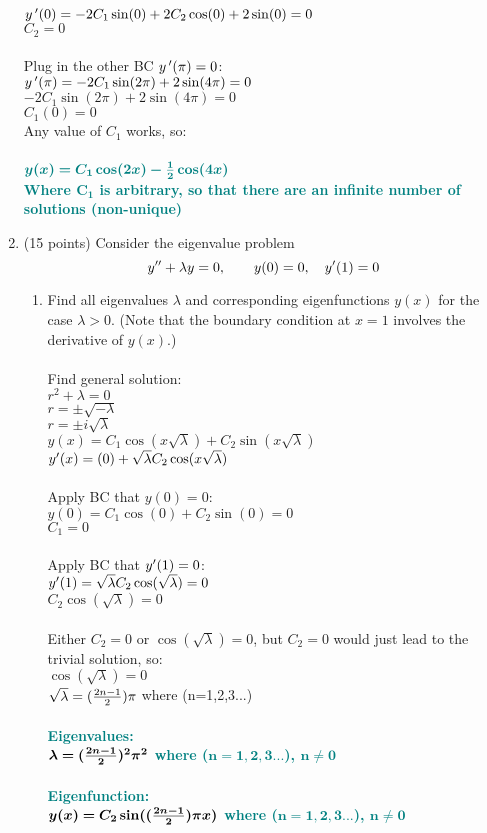 \documentclass{article}
\begin{document}
\begin{enumerate}
$y\,\sp\prime(0) = -2C_1\sin(0) + 2C_2\cos(0) + 2\sin(0) = 0$\\
$C_2 = 0$\\\\
Plug in the other BC $y\,\sp\prime(\pi)=0$:\\
$y\,\sp\prime(\pi) = -2C_1\sin(2\pi) + 2\sin(4\pi) = 0$\\
$-2C_1\sin(2\pi) + 2\sin(4\pi) = 0$\\
$C_1(0)= 0$\\
Any value of $C_1$ works, so:\\\\
$\textcolor{teal}{\bm{y(x) = C_1\cos(2x) - {1\over2}\cos(4x)}}$\\
\textcolor{teal}{\textbf{Where $\bm{C_1}$ is arbitrary, so that there are an infinite number of solutions (non-unique)}}\\

\newpage
\item (15 points)  Consider the eigenvalue problem
\[
y\sp{\prime\prime}+\lambda y=0,\qquad y(0)=0,\quad y\sp\prime(1)=0
\]
\begin{enumerate}
\item
Find all eigenvalues $\lambda$ and corresponding eigenfunctions $y(x)$ for the case $\lambda>0$.  (Note that the boundary condition at $x=1$ involves the derivative of $y(x)$.)\\\\
Find general solution:\\
$r^2 + \lambda = 0$\\
$r = \pm\sqrt{-\lambda}$\\
$r = \pm i\sqrt{\lambda}$\\
$y(x) = C_1\cos(x\sqrt{\lambda}) + C_2\sin(x\sqrt{\lambda})$\\
$y\sp\prime(x) =(0) + \sqrt{\lambda}C_2\cos(x\sqrt{\lambda})$\\\\
Apply BC that $y(0)=0$:\\
$y(0) = C_1\cos(0) + C_2\sin(0) = 0$\\
$C_1 = 0$\\\\
Apply BC that $y\sp\prime(1) = 0$:\\
$y\sp\prime(1) = \sqrt{\lambda}C_2\cos(\sqrt{\lambda}) = 0$\\
$C_2\cos(\sqrt{\lambda}) = 0$\\\\
Either $C_2 = 0$ or $\cos(\sqrt{\lambda})=0$, but $C_2=0$ would just lead to the trivial solution, so:\\
$\cos(\sqrt{\lambda}) = 0$\\
$\sqrt{\lambda} = ({2n-1\over2})\pi$ where (n=1,2,3...)\\\\
\textcolor{teal}{\textbf{Eigenvalues:\\
$\bm{\lambda = ({2n-1\over2})^2\pi^2}$ where ($\bm{n=1,2,3...}$), $\bm{n\neq 0}$\\\\
Eigenfunction:\\
$\bm{y(x) = C_2\sin(({2n-1\over2})\pi x)}$ where ($\bm{n=1,2,3...}$), $\bm{n\neq 0}$}}\\


\end{enumerate}
\end{enumerate}
\end{document}

